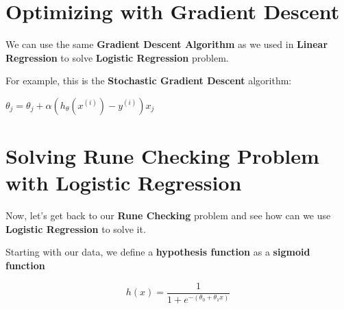 \documentclass{article}
\begin{document}
\section{Optimizing with Gradient Descent}

\begin{flushleft}
We can use the same \textbf{Gradient Descent Algorithm} as we used in \textbf{Linear Regression} to solve \textbf{Logistic Regression} problem.
\end{flushleft}

\begin{flushleft}
For example, this is the \textbf{Stochastic Gradient Descent} algorithm:
\end{flushleft}

\begin{algorithmic}
\Loop
            $\theta_{j} = \theta_{j} + \alpha(h_{\theta}(x^{(i)}) - y^{(i)})x_{j}$
        \EndFor
    \EndFor
\EndLoop
\end{algorithmic}

\section{Solving Rune Checking Problem with Logistic Regression}

\begin{flushleft}
Now, let's get back to our \textbf{Rune Checking} problem and see how can we use \textbf{Logistic Regression} to solve it.
\end{flushleft}

\begin{flushleft}
Starting with our data, we define a \textbf{hypothesis function} as a \textbf{sigmoid function}
\end{flushleft}

\begin{equation}
    h(x) = \frac{1}{1 + e^{-(\theta_{0} + \theta_{1}x)}}
\end{equation}

\begin{center}
\end{center}
\end{document}
